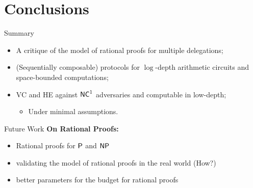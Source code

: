 \section{Conclusions}

\begin{frame}{Summary}
		\begin{itemize}[<+- | alert@+>]	
			\item A critique of the model of rational proofs for multiple delegations;
			\item (Sequentially composable) protocols for $\log$-depth arithmetic circuits and space-bounded computations;
			\item VC and HE against $\NC^1$ adversaries and computable in low-depth;
			\begin{itemize}
				\item Under minimal assumptions.
			\end{itemize}
		\end{itemize}
\end{frame}






\begin{frame}{Future Work}
	\textbf{On Rational Proofs:}
	\begin{itemize}[<+- |  alert@+>]
		\item Rational proofs for $\P$ and $\NP$
		\item validating the model of rational proofs in the real world (How?)
		\item better parameters for the budget for rational proofs 
	\end{itemize}
\end{frame}